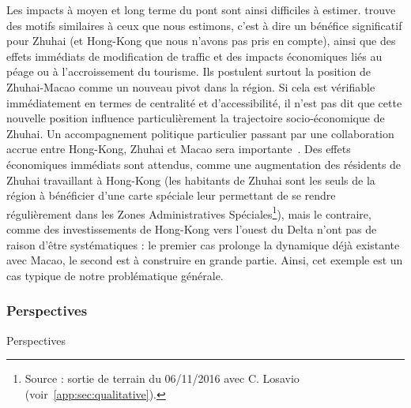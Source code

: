 Les impacts à moyen et long terme du pont sont ainsi difficiles à estimer. \cite{wu2012impact} trouve des motifs similaires à ceux que nous estimons, c'est à dire un bénéfice significatif pour Zhuhai (et Hong-Kong que nous n'avons pas pris en compte), ainsi que des effets immédiats de modification de traffic et des impacts économiques liés au péage ou à l'accroissement du tourisme. Ils postulent surtout la position de Zhuhai-Macao comme un nouveau pivot dans la région. Si cela est vérifiable immédiatement en termes de centralité et d'accessibilité, il n'est pas dit que cette nouvelle position influence particulièrement la trajectoire socio-économique de Zhuhai. Un accompagnement politique particulier passant par une collaboration accrue entre Hong-Kong, Zhuhai et Macao sera importante~\cite{zhou2016medium}. Des effets économiques immédiats sont attendus, comme une augmentation des résidents de Zhuhai travaillant à Hong-Kong (les habitants de Zhuhai sont les seuls de la région à bénéficier d'une carte spéciale leur permettant de se rendre régulièrement dans les Zones Administratives Spéciales\footnote{Source : sortie de terrain du 06/11/2016 avec C. Losavio (voir~\ref{app:sec:qualitative}).}), mais le contraire, comme des investissements de Hong-Kong vers l'ouest du Delta n'ont pas de raison d'être systématiques : le premier cas prolonge la dynamique déjà existante avec Macao, le second est à construire en grande partie. Ainsi, cet exemple est un cas typique de notre problématique générale.


\subsubsection{Perspectives}{Perspectives}



